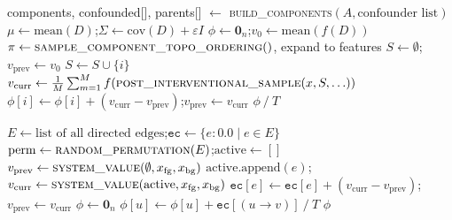 \documentclass[12pt,letterpaper,twocolumn]{article}
\begin{document}
\begin{algorithm}[H]
  \caption{Causal Shapley (post-interventional)}
  \label{alg:causal}
  \begin{algorithmic}[1]
    \PRECOMPUTE components, confounded[], parents[] $\gets$ \textsc{build\_components}$(A, \text{confounder list})$
    \State $\mu \gets \text{mean}(D)$;\quad $\Sigma \gets \text{cov}(D) + \varepsilon I$
    \State $\phi \gets \mathbf{0}_n$;\quad $v_0 \gets \text{mean}(f(D))$
      \State $\pi \gets \textsc{sample\_component\_topo\_ordering}()$, expand to features
      \State $S \gets \emptyset$;\quad $v_{\text{prev}} \gets v_0$
        \State $S \gets S \cup \{i\}$
        \State $v_{\text{curr}} \gets \frac{1}{M}\sum_{m=1}^{M} f\!\left(\textsc{post\_interventional\_sample}(x, S, \ldots)\right)$
        \State $\phi[i] \gets \phi[i] + (v_{\text{curr}} - v_{\text{prev}})$;\quad $v_{\text{prev}} \gets v_{\text{curr}}$
      \EndFor
    \EndFor
    \Return $\phi \mathbin{/} T$
  \end{algorithmic}
\end{algorithm}

\begin{algorithm}[H]
  \caption{Shapley Flow (uniform edge-permutation)}
  \label{alg:flow}
  \begin{algorithmic}[1]
    \State $E \gets \text{list of all directed edges}$;\quad $\texttt{ec} \gets \{e: 0.0 \mid e \in E\}$
      \State $\text{perm} \gets \textsc{random\_permutation}(E)$;\quad $\text{active} \gets []$
      \State $v_{\text{prev}} \gets \textsc{system\_value}(\emptyset, x_{\mathrm{fg}}, x_{\mathrm{bg}})$
        \State $\text{active.append}(e)$;\quad $v_{\text{curr}} \gets \textsc{system\_value}(\text{active}, x_{\mathrm{fg}}, x_{\mathrm{bg}})$
        \State $\texttt{ec}[e] \gets \texttt{ec}[e] + (v_{\text{curr}} - v_{\text{prev}})$;\quad $v_{\text{prev}} \gets v_{\text{curr}}$
      \EndFor
    \EndFor
    \State $\phi \gets \mathbf{0}_n$
      \State $\phi[u] \gets \phi[u] + \texttt{ec}[(u \to v)] \mathbin{/} T$
    \EndFor
    \Return $\phi$
  \end{algorithmic}
\end{algorithm}
\end{document}
